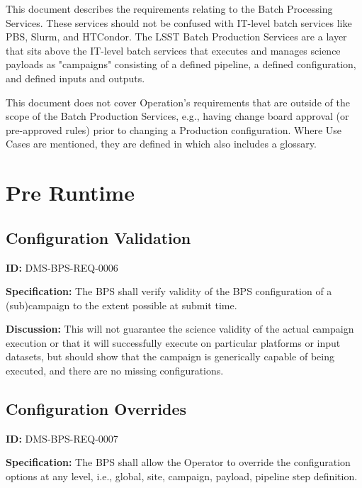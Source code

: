 \documentclass[SE,toc,lsstdraft]{lsstdoc}
\date{2019-03-07}
\begin{document}
\maketitle

This document describes the requirements relating to the Batch Processing Services.  These services should not be confused with IT-level batch services like PBS, Slurm, and HTCondor.  The LSST Batch Production Services are a layer that sits above the IT-level batch services that executes and manages science payloads as "campaigns" consisting of a defined pipeline, a defined configuration, and defined inputs and outputs.

This document does not cover Operation’s requirements that are outside of the scope of the Batch Production Services, e.g., having change board approval (or pre-approved rules) prior to changing a Production configuration. Where Use Cases are mentioned, they are defined in  which also includes a glossary.
\section{Pre Runtime}

\subsection{Configuration Validation}

\label{DMS-BPS-REQ-0006}
\textbf{ID:} DMS-BPS-REQ-0006

\textbf{Specification:}
The BPS shall verify validity of the BPS configuration of a (sub)campaign to the extent possible at submit time.

\textbf{Discussion:}
This will not guarantee the science validity of the actual campaign execution or that it will successfully execute on particular platforms or input datasets, but should show that the campaign is generically capable of being executed, and there are no missing configurations.

\subsection{Configuration Overrides}

\label{DMS-BPS-REQ-0007}
\textbf{ID:} DMS-BPS-REQ-0007

\textbf{Specification:}
The BPS shall allow the Operator to override the configuration options at any level, i.e., global, site, campaign, payload, pipeline step definition.
\end{document}
